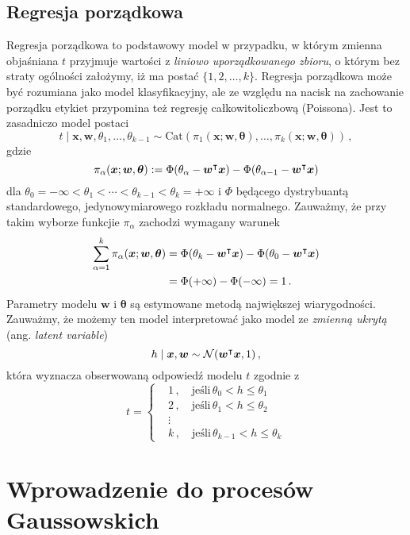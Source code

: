 \documentclass{myclass}
\begin{document}
\subsection{Regresja porządkowa}

Regresja porządkowa to podstawowy model w przypadku, w którym zmienna objaśniana $t$ przyjmuje
wartości z \emph{liniowo uporządkowanego zbioru}, o którym bez straty ogólności założymy, iż ma
postać $\{1,2,\ldots,k\}$. Regresja porządkowa może być rozumiana jako model klasyfikacyjny, ale ze
względu na nacisk na zachowanie porządku etykiet przypomina też regresję całkowitoliczbową
(Poissona). Jest to zasadniczo model postaci
\[
    t \mid \bm{x}, \bm{w}, \theta_1, \ldots, \theta_{k-1} \sim \text{Cat}(\pi_1(\bm{x}; \bm{w}, \bm{\theta}), \ldots, \pi_k(\bm{x}; \bm{w}, \bm{\theta}))\,,
\]
gdzie
\[
    \pi_\alpha(\bm{x}; \bm{w}, \bm{\theta}) := \Phi(\theta_\alpha - \bm{w}^\intercal \bm{x}) - \Phi(\theta_{\alpha-1} - \bm{w}^\intercal \bm{x})
\]
dla $\theta_0 = -\infty < \theta_1 < \cdots < \theta_{k-1} < \theta_k = +\infty$ i $\Phi$ będącego
dystrybuantą standardowego, jedynowymiarowego rozkładu normalnego. Zauważmy, że przy takim wyborze
funkcjie $\pi_\alpha$ zachodzi wymagany warunek
\[
\begin{split}
\sum_{\alpha=1}^k \pi_\alpha (\bm{x}; \bm{w}, \bm{\theta}) &= \Phi(\theta_k - \bm{w}^\intercal \bm{x}) - \Phi(\theta_0 - \bm{w}^\intercal \bm{x}) \\
                                                           &= \Phi(+\infty) - \Phi(-\infty) = 1\,.
\end{split}
\]
Parametry modelu $\bm{w}$ i $\bm{\theta}$ są estymowane metodą największej wiarygodności. Zauważmy,
że możemy ten model interpretować jako model ze \emph{zmienną ukrytą} (ang. \emph{latent variable})
\[
    h \mid \bm{x}, \bm{w} \sim \mathcal{N}(\bm{w}^\intercal \bm{x}, 1)\,,
\]
która wyznacza obserwowaną odpowiedź modelu $t$ zgodnie z
\[
    t = \begin{cases}
        &1\,,\quad \text{jeśli}\,\theta_0 < h \leq \theta_1\\
        &2\,,\quad \text{jeśli}\,\theta_1 < h \leq \theta_2\\
        &\vdots\\
        &k\,,\quad \text{jeśli}\,\theta_{k-1} < h \leq \theta_k
    \end{cases}
\]




\section{Wprowadzenie do procesów Gaussowskich}
\end{document}
